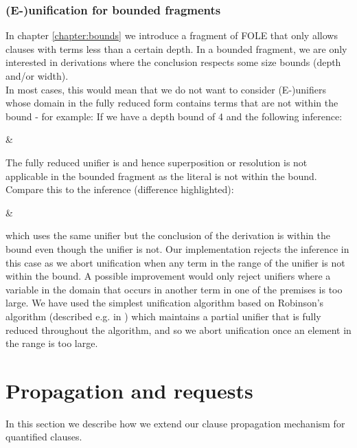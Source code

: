 \subsubsection*{(E-)unification for bounded fragments}
In chapter \ref{chapter:bounds} we introduce a fragment of FOLE that only allows clauses with terms less than a certain depth.
In a bounded fragment, we are only interested in derivations where the conclusion respects some size bounds (depth and/or width).\\
In most cases, this would mean that we do not want to consider (E-)unifiers whose domain in the fully reduced form contains terms that are not within the bound - for example:
If we have a depth bound of 4 and the following inference:

\bigskip

\noindent
{}
{
	&
}

\bigskip

\noindent
The fully reduced unifier is  
and hence superposition or resolution is not applicable in the bounded fragment as the literal  is not within the bound.
Compare this to the inference (difference highlighted):\\
\bigskip

\noindent
{}
{
	&
}

\bigskip

\noindent
which uses the same unifier but the conclusion of the derivation is within the bound even though the unifier is not. 
Our implementation rejects the inference in this case as we abort unification when any term in the range of the unifier is not within the bound. A possible improvement would only reject unifiers where a variable in the domain that occurs in another term in one of the premises is too large. 
We have used the simplest unification algorithm based on Robinson's algorithm (described e.g. in \cite{Baader2001445}) which maintains a partial unifier that is fully reduced throughout the algorithm, and so we abort unification once an element in the range is too large. 

\section{Propagation and requests}
In this section we describe how we extend our clause propagation mechanism for quantified clauses.
